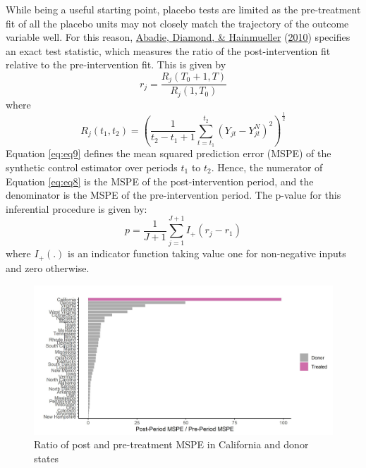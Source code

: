 \documentclass[12pt,nobind, a4paper]{reedthesis}
\begin{document}
 While being a useful starting point, placebo tests are limited as the pre-treatment fit of all the placebo units may not closely match the trajectory of the outcome variable well. For this reason, \protect\hyperlink{ref-abadie_synthetic_2010}{Abadie, Diamond, \& Hainmueller} (\protect\hyperlink{ref-abadie_synthetic_2010}{2010}) specifies an exact test statistic, which measures the ratio of the post-intervention fit relative to the pre-intervention fit. This is given by
 \begin{equation}
 r_{j}= \frac{R_{j}(T_{0}+1,T)}{R_{j}(1,T_{0})}
 \label{eq:eq8}
 \end{equation}
 where
 \begin{equation}
 R_{j}(t_{1},t_{2})= \left
 (\frac{1}{t_{2}-t_{1}+1} \sum_{t=t_{1}}^{t_{2}}(Y_{jt}-Y_{jt}^{N})^2\right)^{\frac{1}{2}}
 \label{eq:eq9}
 \end{equation}
 Equation \eqref{eq:eq9} defines the mean squared prediction error (MSPE) of the synthetic control estimator over periods \(t_{1}\) to \(t_{2}\). Hence, the numerator of Equation \eqref{eq:eq8} is the MSPE of the post-intervention period, and the denominator is the MSPE of the pre-intervention period. The p-value for this inferential procedure is given by:
 \begin{equation}
 p= \frac{1}{J+1} \sum_{j=1}^{J+1}I_{+}(r_{j}-r_{1})
 \label{eq:eq10}
 \end{equation}
 where \(I_{+}(.)\) is an indicator function taking value one for non-negative inputs and zero otherwise.
 \begin{figure}

 {\centering \includegraphics[width=1\linewidth]{figure/calmspe} 

 }

 \caption{Ratio of post and pre-treatment MSPE in California and donor states}\label{fig:mspe}
 \end{figure}
\end{document}
